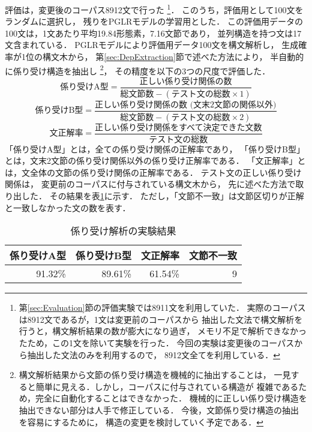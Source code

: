 評価は，変更後のコーパス8912文で行った
\footnote{第\ref{sec:Evaluation}節の評価実験では8911文を利用していた．
実際のコーパスは8912文であるが，1文は変更前のコーパスから
抽出した文法で構文解析を行うと，構文解析結果の数が膨大になり過ぎ，
メモリ不足で解析できなかったため，この1文を除いて実験を行った．
今回の実験は変更後のコーパスから抽出した文法のみを利用するので，
8912文全てを利用している．}．
このうち，評価用として100文をランダムに選択し，
残りをPGLRモデルの学習用とした．
この評価用データの100文は，1文あたり平均19.84形態素，7.16文節であり，
並列構造を持つ文は17文含まれている．
PGLRモデルにより評価用データ100文を構文解析し，
生成確率が1位の構文木から，
第\ref{sec:DepExtraction}節で述べた方法により，
半自動的に係り受け構造を抽出し
\footnote{構文解析結果から文節の係り受け構造を機械的に抽出することは，
一見すると簡単に見える．しかし，コーパスに付与されている構造が
複雑であるため，完全に自動化することはできなかった．
機械的に正しい係り受け構造を抽出できない部分は人手で修正している．
今後，文節係り受け構造の抽出を容易にするために，
構造の変更を検討していく予定である．}，
その精度を以下の3つの尺度で評価した．
\[\mbox{係り受けA型}=\frac{\mbox{正しい係り受け関係の数}}
{\mbox{総文節数}-(\mbox{テスト文の総数}\times 1)}\]
\[\mbox{係り受けB型}=\frac{\mbox{正しい係り受け関係の数
    (文末2文節の関係以外)}}{\mbox{総文節数}-(\mbox{テスト文の総数}
    \times 2)}\]
\[\mbox{文正解率}=\frac{\mbox{正しい係り受け関係をすべて決定できた文数}}
{\mbox{テスト文の総数}}\]
「係り受けA型」とは，全ての係り受け関係の正解率であり，
「係り受けB型」とは，文末2文節の係り受け関係以外の係り受け正解率である．
「文正解率」とは，文全体の文節の係り受け関係の正解率である．
テスト文の正しい係り受け関係は，
変更前のコーパスに付与されている構文木から，
先に述べた方法で取り出した．
その結果を表\ref{tab:result_sdda}に示す．
ただし，「文節不一致」は文節区切りが正解と一致しなかった文の数を表す．

\begin{table}[tp]
  \centering
  \caption{係り受け解析の実験結果}
  \label{tab:result_sdda}
  \begin{tabular}{|r|r|r|r|}\hline
    \multicolumn{1}{|c|}{係り受けA型}
    & \multicolumn{1}{|c|}{係り受けB型}
    & \multicolumn{1}{|c|}{文正解率}
    & \multicolumn{1}{|c|}{文節不一致}\\\hline
    91.32\% & 89.61\% & 61.54\% & 9\\\hline
  \end{tabular}
\end{table}

